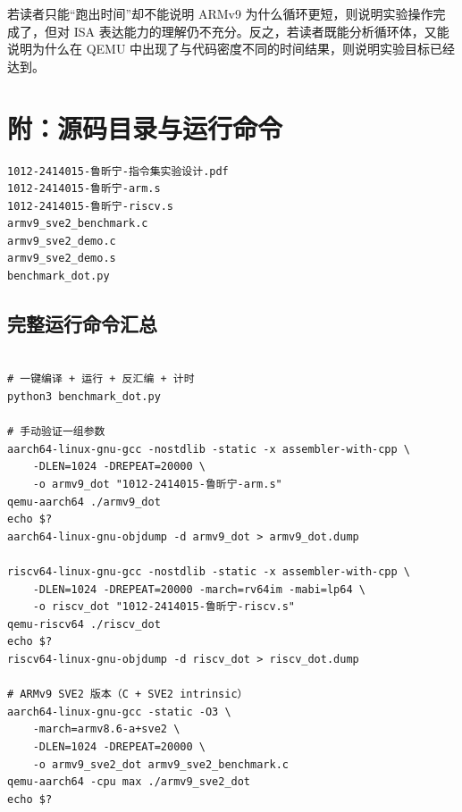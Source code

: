 \documentclass{article}
\begin{document}
若读者只能“跑出时间”却不能说明 ARMv9 为什么循环更短，则说明实验操作完成了，但对 ISA 表达能力的理解仍不充分。反之，若读者既能分析循环体，又能说明为什么在 QEMU 中出现了与代码密度不同的时间结果，则说明实验目标已经达到。

\section{附：源码目录与运行命令}
\begin{Verbatim}[frame=single]
1012-2414015-鲁昕宁-指令集实验设计.pdf
1012-2414015-鲁昕宁-arm.s
1012-2414015-鲁昕宁-riscv.s
armv9_sve2_benchmark.c
armv9_sve2_demo.c
armv9_sve2_demo.s
benchmark_dot.py
\end{Verbatim}


\subsection{完整运行命令汇总}
\begin{Verbatim}[frame=single]

# 一键编译 + 运行 + 反汇编 + 计时
python3 benchmark_dot.py

# 手动验证一组参数
aarch64-linux-gnu-gcc -nostdlib -static -x assembler-with-cpp \
    -DLEN=1024 -DREPEAT=20000 \
    -o armv9_dot "1012-2414015-鲁昕宁-arm.s"
qemu-aarch64 ./armv9_dot
echo $?
aarch64-linux-gnu-objdump -d armv9_dot > armv9_dot.dump

riscv64-linux-gnu-gcc -nostdlib -static -x assembler-with-cpp \
    -DLEN=1024 -DREPEAT=20000 -march=rv64im -mabi=lp64 \
    -o riscv_dot "1012-2414015-鲁昕宁-riscv.s"
qemu-riscv64 ./riscv_dot
echo $?
riscv64-linux-gnu-objdump -d riscv_dot > riscv_dot.dump

# ARMv9 SVE2 版本（C + SVE2 intrinsic）
aarch64-linux-gnu-gcc -static -O3 \
    -march=armv8.6-a+sve2 \
    -DLEN=1024 -DREPEAT=20000 \
    -o armv9_sve2_dot armv9_sve2_benchmark.c
qemu-aarch64 -cpu max ./armv9_sve2_dot
echo $?
\end{Verbatim}
\end{document}
